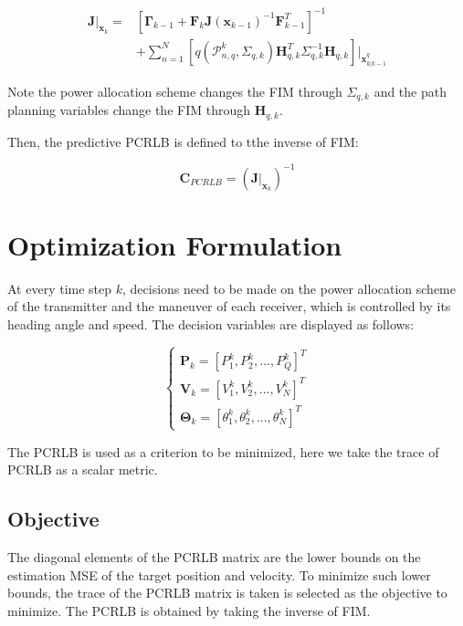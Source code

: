 \documentclass[12pt,journal,draftclsnofoot,onecolumn]{IEEEtran}
\begin{document}
\begin{equation}
	\begin{aligned}
	\mathbf{J}|_{\mathbf{x}_k}=&[\mathbf{\Gamma}_{k-1}+\mathbf{F}_k\mathbf{J}(\mathbf{x}_{k-1})^{-1}\mathbf{F}_{k-1}^T]^{-1}\\
	&+\sum_{n=1}^{N}[q(\mathcal{P}_{n,q}^k,\Sigma_{q,k})\mathbf{H}_{q,k}^T\Sigma_{q,k}^{-1}\mathbf{H}_{q,k}]\bigg|_{\mathbf{x}_{k|k-1}^q}
	\end{aligned}
    \label{eqn:predicted FIM}
\end{equation}

Note the power allocation scheme changes the FIM through $\Sigma_{q,k}$ and the path planning variables change the FIM through $\mathbf{H}_{q,k}$.

Then, the predictive PCRLB is defined to tthe inverse of FIM:

\begin{equation}
	\mathbf{C}_{PCRLB} = (\mathbf{J}|_{\mathbf{x}_k})^{-1}
\end{equation} 

\section{Optimization Formulation}
At every time step $k$, decisions need to be made on the power allocation scheme of the transmitter and the maneuver of each receiver, which is controlled by its heading angle and speed. The decision variables are displayed as follows:

\begin{equation}
    \left\{
    \begin{array}{lr}
    \mathbf{P}_k=[P_1^k, P_2^k,..., P_Q^k]^T
    \\\mathbf{V}_k=[V_1^k, V_2^k,..., V_N^k]^T
    \\\mathbf{\Theta}_k=[\theta_1^k, \theta_2^k,..., \theta_N^k]^T
    \end{array}
    \right.
\end{equation}

The PCRLB is used as a criterion to be minimized, here we take the trace of PCRLB as a scalar metric.

\subsection{Objective}
The diagonal elements of the PCRLB matrix are the lower bounds on the estimation MSE of the target position and velocity. To minimize such lower bounds, the trace of the PCRLB matrix is taken is selected as the objective to minimize. The PCRLB is obtained by taking the inverse of FIM. 
\end{document}
